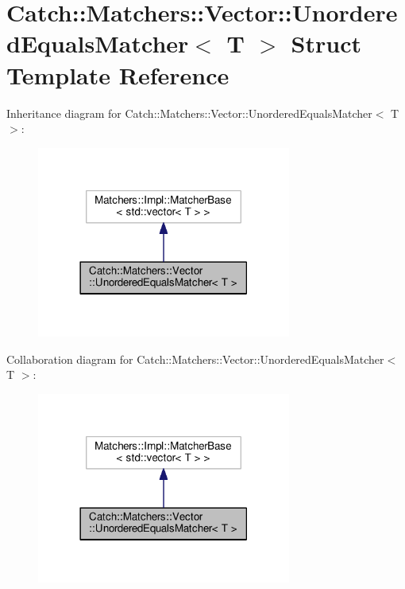 \hypertarget{structCatch_1_1Matchers_1_1Vector_1_1UnorderedEqualsMatcher}{}\section{Catch\+:\+:Matchers\+:\+:Vector\+:\+:Unordered\+Equals\+Matcher$<$ T $>$ Struct Template Reference}
\label{structCatch_1_1Matchers_1_1Vector_1_1UnorderedEqualsMatcher}


Inheritance diagram for Catch\+:\+:Matchers\+:\+:Vector\+:\+:Unordered\+Equals\+Matcher$<$ T $>$\+:
\nopagebreak
\begin{figure}[H]
\begin{center}
\leavevmode
\includegraphics[width=237pt]{structCatch_1_1Matchers_1_1Vector_1_1UnorderedEqualsMatcher__inherit__graph}
\end{center}
\end{figure}


Collaboration diagram for Catch\+:\+:Matchers\+:\+:Vector\+:\+:Unordered\+Equals\+Matcher$<$ T $>$\+:
\nopagebreak
\begin{figure}[H]
\begin{center}
\leavevmode
\includegraphics[width=237pt]{structCatch_1_1Matchers_1_1Vector_1_1UnorderedEqualsMatcher__coll__graph}
\end{center}
\end{figure}

